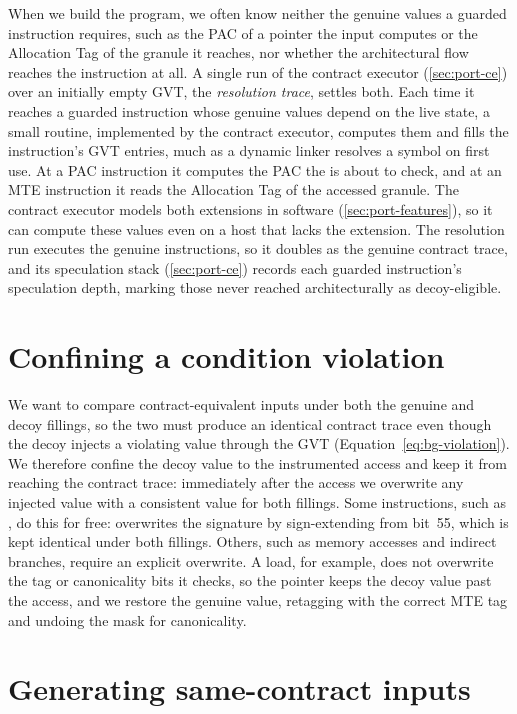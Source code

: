 When we build the program, we often know neither the genuine values a guarded instruction requires,
such as the PAC of a pointer the input computes or the Allocation Tag of the granule it reaches, nor
whether the architectural flow reaches the instruction at all. A single run of the contract executor
(\autoref{sec:port-ce}) over an initially empty GVT, the \emph{resolution trace}, settles both. Each
time it reaches a guarded instruction whose genuine values depend on the live state, a small routine, implemented by the
contract executor, computes them and fills the instruction's GVT entries, much as a dynamic linker
resolves a symbol on
first use. At a PAC instruction it computes the PAC the  is about to check, and at an MTE
instruction it reads the Allocation Tag of the accessed granule. The contract executor models both
extensions in software (\autoref{sec:port-features}), so it can compute these values even on a host
that lacks the extension. The resolution run executes the genuine instructions, so it doubles as the
genuine contract trace, and its speculation stack (\autoref{sec:port-ce}) records each guarded
instruction's speculation depth, marking those never reached architecturally as decoy-eligible.

\section{Confining a condition violation}
\label{sec:precond-confine}

We want to compare contract-equivalent inputs under both the genuine and decoy fillings, so the two
must produce an identical contract trace even though the decoy injects a violating value through
the GVT (Equation~\eqref{eq:bg-violation}). We therefore confine the decoy value to the instrumented
access and keep it from reaching the contract trace: immediately after the access we overwrite any
injected value with a consistent value for both fillings. Some instructions, such as , do
this for free:  overwrites the signature by sign-extending from bit~55, which is kept
identical under both fillings. Others, such as memory accesses and indirect branches, require an
explicit overwrite. A load, for example, does not overwrite the tag or canonicality bits it checks,
so the pointer keeps the decoy value past the access, and we restore the genuine value, retagging
with the correct MTE tag and undoing the mask for canonicality.

\section{Generating same-contract inputs}
\label{sec:precond-inputs}


